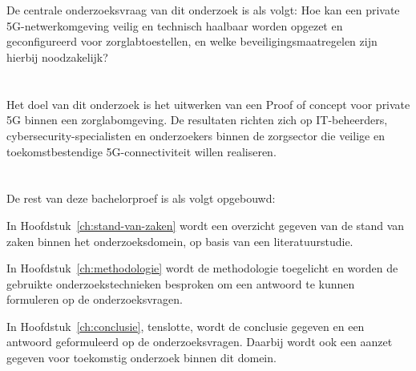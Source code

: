\section{}%
\label{sec:onderzoeksvraag}

De centrale onderzoeksvraag van dit onderzoek is als volgt:
Hoe kan een private 5G-netwerkomgeving veilig en technisch haalbaar worden opgezet en geconfigureerd voor zorglabtoestellen, en welke beveiligingsmaatregelen zijn hierbij noodzakelijk?


\section{}%
\label{sec:onderzoeksdoelstelling}

Het doel van dit onderzoek is het uitwerken van een Proof of concept voor private 5G binnen een zorglabomgeving. De resultaten richten zich op IT-beheerders, cybersecurity-specialisten en onderzoekers binnen de zorgsector die veilige en toekomstbestendige 5G-connectiviteit willen realiseren.

\section{}%
\label{sec:opzet-bachelorproef}


De rest van deze bachelorproef is als volgt opgebouwd:

In Hoofdstuk~\ref{ch:stand-van-zaken} wordt een overzicht gegeven van de stand van zaken binnen het onderzoeksdomein, op basis van een literatuurstudie.

In Hoofdstuk~\ref{ch:methodologie} wordt de methodologie toegelicht en worden de gebruikte onderzoekstechnieken besproken om een antwoord te kunnen formuleren op de onderzoeksvragen.


In Hoofdstuk~\ref{ch:conclusie}, tenslotte, wordt de conclusie gegeven en een antwoord geformuleerd op de onderzoeksvragen. Daarbij wordt ook een aanzet gegeven voor toekomstig onderzoek binnen dit domein.